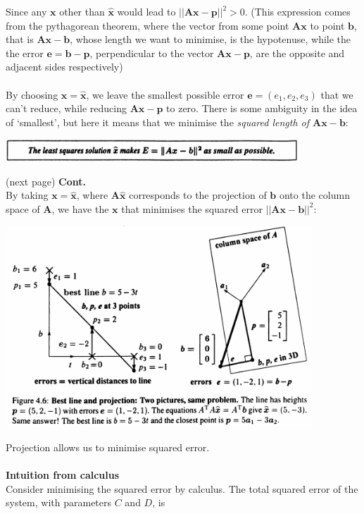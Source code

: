 \documentclass{report}
\begin{document}
Since any $\bm x$ other than $\hat{\bm x}$ would lead to $||\bm{Ax}-\bm p||^2>0$. (This expression comes from the pythagorean theorem, where the vector from some
point $\bm{Ax}$ to point $\bm b$, that is $\bm{Ax}-\bm b$, whose length we want to minimise, is the 
hypotenuse, while the the error $\bm e=\bm b-\bm p$, perpendicular to 
the vector $\bm{Ax}-\bm p$, are the opposite and adjacent sides respectively)\\
\vspace{1mm}\\
By choosing $\bm x=\hat{\bm x}$, we leave the smallest possible error $\bm e=(e_1,e_2,e_3)$ that we can't reduce, while reducing $\bm{Ax}-\bm p$ to zero. 
There is some ambiguity in the idea of `smallest', but here it means that we minimise the \textit{squared length of $\bm{Ax}-\bm b$}:
\begin{center}
\includegraphics[width=11cm]{67}
\end{center}
(next page)\newpage
\noindent\textbf{Cont.}\\
By taking $\bm x=\hat{\bm x}$, where $\bm A\hat{\bm x}$ corresponds to the projection of $\bm b$ onto the column space of $\bm A$, we have the $\bm x$ that minimises the 
squared error $||\bm{Ax}-\bm b||^2$:
\begin{center}
\includegraphics[width=11.5cm]{68}
\end{center}
Projection allows us to minimise squared error.\\
\vspace{1mm}\\
\textbf{Intuition from calculus}\\
Consider minimising the squared error by calculus. The total squared error of the system, with parameters $C$ and $D$, is
\end{document}
